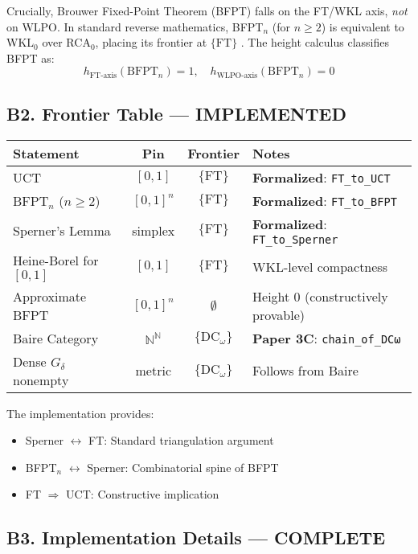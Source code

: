 \documentclass[11pt]{article}
\theoremstyle{definition}
\theoremstyle{remark}
\newcommand{\FT}{\mathrm{FT}}
\begin{document}
Crucially, Brouwer Fixed-Point Theorem (BFPT) falls on the FT/WKL axis, \emph{not} on WLPO. In standard reverse mathematics, BFPT$_n$ (for $n \geq 2$) is equivalent to WKL$_0$ over RCA$_0$, placing its frontier at $\{\FT\}$ \cite{Shioji-Tanaka}. The height calculus classifies BFPT as:
\[h_{\text{FT-axis}}(\text{BFPT}_n) = 1, \quad h_{\text{WLPO-axis}}(\text{BFPT}_n) = 0\]

\subsection{B2. Frontier Table — \textbf{\color{green}IMPLEMENTED}}

\begin{center}
\begin{tabular}{l|c|c|p{5cm}}
\hline
\textbf{Statement} & \textbf{Pin} & \textbf{Frontier} & \textbf{Notes} \\
\hline
UCT & $[0,1]$ & $\{\FT\}$ & \textbf{\color{green}Formalized}: \texttt{FT\_to\_UCT} \\
BFPT$_n$ ($n \geq 2$) & $[0,1]^n$ & $\{\FT\}$ & \textbf{\color{green}Formalized}: \texttt{FT\_to\_BFPT} \\
Sperner's Lemma & simplex & $\{\FT\}$ & \textbf{\color{green}Formalized}: \texttt{FT\_to\_Sperner} \\
Heine-Borel for $[0,1]$ & $[0,1]$ & $\{\FT\}$ & WKL-level compactness \\
Approximate BFPT & $[0,1]^n$ & $\emptyset$ & Height 0 (constructively provable) \\
\hline
Baire Category & $\mathbb{N}^{\mathbb{N}}$ & $\{\mathrm{DC}_\omega\}$ & \textbf{\color{green}Paper 3C}: \texttt{chain\_of\_DCω} \\
Dense $G_\delta$ nonempty & metric & $\{\mathrm{DC}_\omega\}$ & Follows from Baire \\
\hline
\end{tabular}
\end{center}

The implementation provides:
\begin{itemize}
\item Sperner $\leftrightarrow$ FT: Standard triangulation argument \cite{Fridman-Simpson}
\item BFPT$_n$ $\leftrightarrow$ Sperner: Combinatorial spine of BFPT
\item FT $\Rightarrow$ UCT: Constructive implication \cite{Ishihara-RM}
\end{itemize}

\subsection{B3. Implementation Details — \textbf{\color{green}COMPLETE}}
\end{document}
